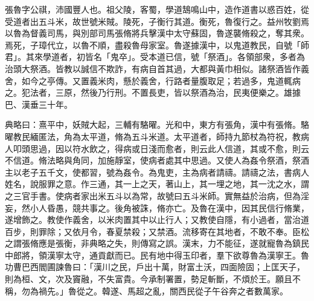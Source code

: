
\begin{pinyinscope}
張魯字公祺，沛國豐人也。祖父陵，客蜀，學道鵠鳴山中，造作道書以惑百姓，從受道者出五斗米，故世號米賊。陵死，子衡行其道。衡死，魯復行之。益州牧劉焉以魯為督義司馬，與別部司馬張脩將兵擊漢中太守蘇固，魯遂襲脩殺之，奪其衆。焉死，子璋代立，以魯不順，盡殺魯母家室。魯遂據漢中，以鬼道教民，自號「師君」。其來學道者，初皆名「鬼卒」。受本道已信，號「祭酒」。各領部衆，多者為治頭大祭酒。皆教以誠信不欺詐，有病自首其過，大都與黃巾相似。諸祭酒皆作義舍，如今之亭傳。又置義米肉，懸於義舍，行路者量腹取足；若過多，鬼道輒病之。犯法者，三原，然後乃行刑。不置長吏，皆以祭酒為治，民夷便樂之。雄據巴、漢垂三十年。

典略曰：熹平中，妖賊大起，三輔有駱曜。光和中，東方有張角，漢中有張脩。駱曜教民緬匿法，角為太平道，脩為五斗米道。太平道者，師持九節杖為符祝，教病人叩頭思過，因以符水飲之，得病或日淺而愈者，則云此人信道，其或不愈，則云不信道。脩法略與角同，加施靜室，使病者處其中思過。又使人為姦令祭酒，祭酒主以老子五千文，使都習，號為姦令。為鬼吏，主為病者請禱。請禱之法，書病人姓名，說服罪之意。作三通，其一上之天，著山上，其一埋之地，其一沈之水，謂之三官手書。使病者家出米五斗以為常，故號曰五斗米師。實無益於治病，但為淫妄，然小人昏愚，競共事之。後角被誅，脩亦亡。及魯在漢中，因其民信行脩業，遂增飾之。教使作義舍，以米肉置其中以止行人；又教使自隱，有小過者，當治道百步，則罪除；又依月令，春夏禁殺；又禁酒。流移寄在其地者，不敢不奉。臣松之謂張脩應是張衡，非典略之失，則傳寫之誤。漢末，力不能征，遂就寵魯為鎮民中郎將，領漢寧太守，通貢獻而已。民有地中得玉印者，羣下欲尊魯為漢寧王。魯功曹巴西閻圃諫魯曰：「漢川之民，戶出十萬，財富土沃，四面險固；上匡天子，則為桓、文，次及竇融，不失富貴。今承制署置，勢足斬斷，不煩於王。願且不稱，勿為禍先。」魯從之。韓遂、馬超之亂，關西民從子午谷奔之者數萬家。


\end{pinyinscope}
